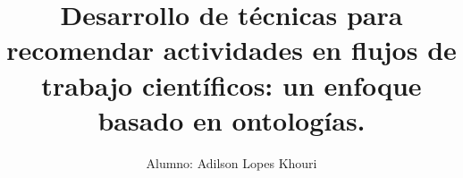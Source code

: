 \documentclass[compress, hyperref={pdfpagelayout=SinglePage}]{beamer}
\title[Presentacion Univ. Andes]{Desarrollo de técnicas para recomendar actividades en flujos de trabajo científicos: un enfoque basado en ontologías.}
\author{Alumno: Adilson Lopes Khouri}
\institute[USP]{Orientador: Prof. Dr. Luciano Antonio Digiampietri}
\begin{document}
\begin{frame}
  \titlepage
\end{frame}











\end{document}
